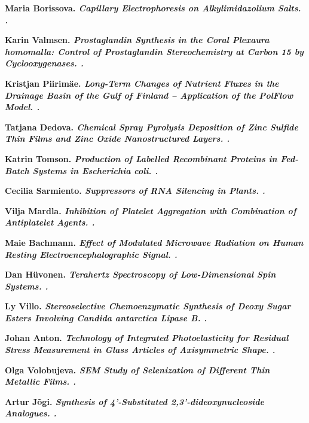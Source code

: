 \begin{list}
\item \bf Maria Borissova. \it Capillary Electrophoresis on Alkylimidazolium
  Salts. .

\item \bf Karin Valmsen. \it Prostaglandin Synthesis in the Coral Plexaura
  homomalla: Control of Prostaglandin Stereochemistry at Carbon 15 by
  Cyclooxygenases. .

\item \bf Kristjan Piirim\"ae. \it Long-Term Changes of Nutrient Fluxes in the
  Drainage Basin of the Gulf of Finland – Application of the PolFlow
  Model. .

\item \bf Tatjana Dedova. \it Chemical Spray Pyrolysis Deposition of Zinc
  Sulfide Thin Films and Zinc Oxide Nanostructured Layers. .

\item \bf Katrin Tomson. \it Production of Labelled Recombinant Proteins in
  Fed-Batch Systems in Escherichia coli. .

\item \bf Cecilia Sarmiento. \it Suppressors of RNA Silencing in Plants. .

\item \bf Vilja Mardla. \it Inhibition of Platelet Aggregation with
  Combination of Antiplatelet Agents. .

\item \bf Maie Bachmann. \it Effect of Modulated Microwave Radiation on Human
  Resting Electroencephalographic Signal. .

\item \bf Dan H\"uvonen. \it Terahertz Spectroscopy of Low-Dimensional Spin
  Systems. .

\item \bf Ly Villo. \it Stereoselective Chemoenzymatic Synthesis of Deoxy
  Sugar Esters Involving Candida antarctica Lipase B. .

\item \bf Johan Anton. \it Technology of Integrated Photoelasticity for
  Residual Stress Measurement in Glass Articles of Axisymmetric
  Shape. .

\item \bf Olga Volobujeva. \it SEM Study of Selenization of Different Thin
  Metallic Films. .

\item \bf Artur J\~ogi. \it Synthesis of 4’-Substituted 2,3’-dideoxynucleoside
  Analogues. .


\end{list}
